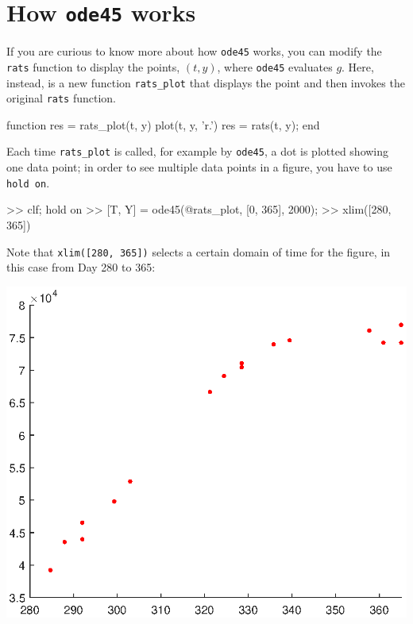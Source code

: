 \documentclass[
]{book}
\numberwithin{Answer}{chapter}
\numberwithin{Exercise}{chapter}
\begin{document}
\section{How {\tt ode45} works}

If you are curious to know more about how {\tt ode45} works, you
can modify the {\tt rats} function to display the points, $(t, y)$, where
{\tt ode45} evaluates $g$.  
Here, instead, is a new function
{\tt rats\_plot}
that displays the point and then invokes the original {\tt rats} function.

\begin{code}
function res = rats_plot(t, y)
    plot(t, y, 'r.')
    res = rats(t, y);
end
\end{code}

Each time {\tt rats\_plot} is called, for example by {\tt ode45}, a dot is plotted showing one data point; in order
to see multiple data points in a figure, you have to use {\tt hold on}.

\begin{code}
>> clf; hold on
>> [T, Y] = ode45(@rats_plot, [0, 365], 2000);
>> xlim([280, 365])
\end{code}

Note that {\tt xlim([280, 365])} selects a certain domain of time for the figure, in this case from Day 280 to 365:

\beforefig \centerline{\includegraphics[width=6.0in]{figs/ode45_simple.eps}}
\end{document}
